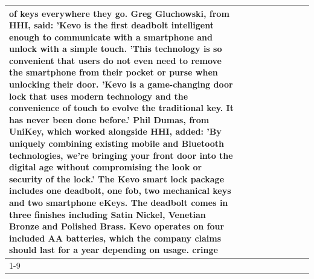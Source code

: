 \begin{table}[H]
\begin{tabular}{lllrlllll}
of keys everywhere they go. Greg Gluchowski, from HHI, said: 'Kevo is the first deadbolt intelligent enough to communicate with a smartphone and unlock with a simple touch. 'This technology is so convenient that users do not even need to remove the smartphone from their pocket or purse when unlocking their door. 'Kevo is a game-changing door lock that uses modern technology and the convenience of touch to evolve the traditional key. It has never been done before.' Phil Dumas, from UniKey, which worked alongside HHI, added: 'By uniquely combining existing mobile and Bluetooth technologies, we’re bringing your front door into the digital age without compromising the look or security of the lock.' The Kevo smart lock package includes one deadbolt, one fob, two mechanical keys and two smartphone eKeys. The deadbolt comes in three finishes including Satin Nickel, Venetian Bronze and Polished Brass. Kevo operates on four included AA batteries, which the company claims should last for a year depending on usage. cringe \\
\cline{1-9}

\end{tabular}
\end{table}
